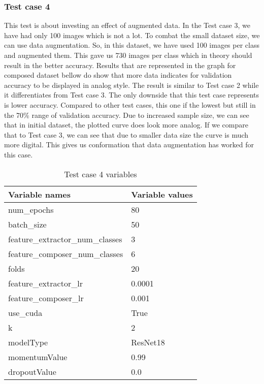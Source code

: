 \subsubsection{Test case 4}
This test is about investing an effect of augmented data. In the Test case 3, we have had only 100 images which is not a lot. To combat the small dataset size, we can use data augmentation. So, in this dataset, we have used 100 images per class and augmented them. This gave us 730 images per class which in theory should result in the better accuracy.
\newline
Results that are represented in the graph for composed dataset bellow do show that more data indicates for validation accuracy to be displayed in analog style. The result is similar to Test case 2 while it differentiates from Test case 3. The only downside that this test case represents is lower accuracy. Compared to other test cases, this one if the lowest but still in the 70\% range of validation accuracy.
\newline
Due to increased sample size, we can see that in initial dataset, the plotted curve does look more analog. If we compare that to Test case 3, we can see that due to smaller data size the curve is much more digital. This gives us conformation that data augmentation has worked for this case.
\begin{table}[!ht]
  \centering
    \begin{tabular}{ |m{15em}|m{17em}| } 
     \hline
        Variable names & Variable values \\ 
     \hline
        num{\_}epochs & 80 \\ 
     \hline
        batch{\_}size & 50 \\
     \hline
        feature{\_}extractor{\_}num{\_}classes & 3 \\
     \hline
        feature{\_}composer{\_}num{\_}classes & 6 \\
     \hline
        folds & 20 \\
     \hline
        feature{\_}extractor{\_}lr & 0.0001 \\
     \hline
        feature{\_}composer{\_}lr & 0.001 \\
     \hline
        use{\_}cuda & True \\
     \hline
        k & 2 \\
     \hline
        modelType & ResNet18 \\
     \hline
        momentumValue & 0.99 \\
     \hline
        dropoutValue & 0.0 \\
     \hline
    \end{tabular}
\caption{Test case 4 variables}
\end{table}

